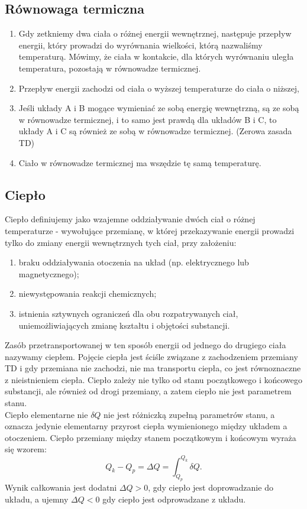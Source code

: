 \documentclass{article}
\begin{document}
\subsection{Równowaga termiczna}
\begin{enumerate}
    \item Gdy zetkniemy dwa ciała o różnej energii wewnętrznej, następuje przepływ energii, który prowadzi do wyrównania wielkości, którą nazwaliśmy temperaturą. Mówimy, że ciała w kontakcie, dla których wyrównaniu uległa temperatura, pozostają w równowadze termicznej. 
    \item Przepływ energii zachodzi od ciała o wyższej temperaturze do ciała o niższej,
    \item Jeśli układy A i B mogące wymieniać ze sobą energię wewnętrzną, są ze sobą w równowadze termicznej, i to samo jest prawdą dla układów B i C, to układy A i C są również ze sobą w równowadze termicznej. (Zerowa zasada TD)
    \item Ciało w równowadze termicznej ma wszędzie tę samą temperaturę. 
\end{enumerate}

\subsection{Ciepło}
Ciepło definiujemy jako wzajemne oddziaływanie dwóch ciał o różnej temperaturze - wywołujące przemianę, w której przekazywanie energii prowadzi tylko do zmiany energii wewnętrznych tych ciał, przy założeniu:
\begin{enumerate}
    \item braku oddziaływania otoczenia na układ (np. elektrycznego lub magnetycznego);
    \item niewystępowania reakcji chemicznych;
    \item istnienia sztywnych ograniczeń dla obu rozpatrywanych ciał, uniemożliwiających zmianę kształtu i objętości substancji.
\end{enumerate}
Zasób przetransportowanej w ten sposób energii od jednego do drugiego ciała nazywamy ciepłem. Pojęcie ciepła jest ściśle związane z zachodzeniem przemiany TD i gdy przemiana nie zachodzi, nie ma transportu ciepła, co jest równoznaczne z nieistnieniem ciepła. Ciepło zależy nie tylko od stanu początkowego i końcowego substancji, ale również od drogi przemiany, a zatem ciepło nie jest parametrem stanu.\\
Ciepło elementarne nie $\delta Q$ nie jest różniczką zupełną parametrów stanu, a oznacza jedynie elementarny przyrost ciepła wymienionego między układem a otoczeniem. Ciepło przemiany między stanem początkowym i końcowym wyraża się wzorem:
\begin{equation*}
    Q_k - Q_p = \Delta Q = \int_{Q_p}^{Q_k}\delta Q.
\end{equation*}
Wynik całkowania jest dodatni $\Delta Q>0$, gdy ciepło jest doprowadzanie do układu, a ujemny $\Delta Q<0$ gdy ciepło jest odprowadzane z układu. \\
\end{document}
